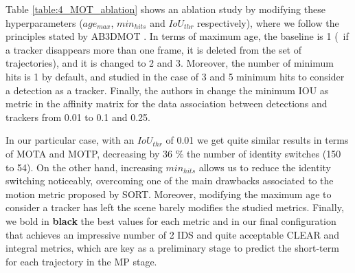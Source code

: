 Table \ref{table:4_MOT_ablation} shows an ablation study by modifying these hyperparameters ($age_{max}$, $min_{hits}$ and $IoU_{thr}$ respectively), where we follow the principles stated by AB3DMOT \cite{weng2019baseline}. In terms of maximum age, the baseline is 1 (\ie \ if a tracker disappears more than one frame, it is deleted from the set of trajectories), and it is changed to 2 and 3. Moreover, the number of minimum hits is 1 by default, and studied in the case of 3 and 5 minimum hits to consider a detection as a tracker. Finally, the authors in \cite{weng2019baseline} change the minimum \ac{IOU} as metric in the affinity matrix for the data association between detections and trackers from 0.01 to 0.1 and 0.25. 

In our particular case, with an $IoU_{thr}$ of 0.01 we get quite similar results in terms of \ac{MOTA} and \ac{MOTP}, decreasing by 36 $\%$ the number of identity switches (150 to 54). On the other hand, increasing $min_{hits}$ allows us to reduce the identity switching noticeably, overcoming one of the main drawbacks associated to the motion metric proposed by \ac{SORT}. Moreover, modifying the maximum age to consider a tracker has left the scene barely modifies the studied metrics. Finally, we bold in \textbf{black} the best values for each metric and in  our final configuration that achieves an impressive number of 2 \ac{IDS} and quite acceptable CLEAR and integral metrics, which are key as a preliminary stage to predict the short-term for each trajectory in the \ac{MP} stage.

